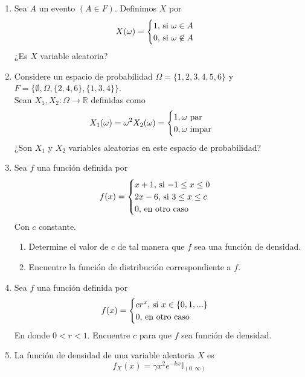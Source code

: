 \documentclass[12pt,a4paper]{report}
\begin{document}
	\begin{enumerate}
		\item {
			Sea $A$ un evento $(A \in F)$. Definimos $X$ por
			\[
				X(\omega) =
				\begin{cases}
					1, $ si $\omega \in A\\
					0, $ si $\omega \not\in A
				\end{cases}
			\]
			¿Es $X$ variable aleatoria?
		}
		\item {
			Considere un espacio de probabilidad $\Omega = \{1, 2, 3, 4, 5, 6\}$ y
			$F = \{\emptyset, \Omega, \{2, 4, 6\}, \{1, 3, 4\}\}$.\\
			Sean $X_1, X_2 : \Omega \rightarrow \mathbb{R}$ definidas como
			\begin{align*}
				X_1(\omega) = \omega^2 & X_2(\omega) = \begin{cases}
																								1, \omega $ par$\\
																								0, \omega $ impar$
																							\end{cases}
			\end{align*}
			¿Son $X_1$ y $X_2$ variables aleatorias en este espacio de probabilidad?
		}
		\item {
			Sea $f$ una función definida por
			\[
				f(x) = \begin{cases}
								x+1, $ si $ -1 \leq x \leq 0\\
								2x-6, $ si $ 3 \leq x \leq c\\
								0, $ en otro caso$
			\end{cases}
			\]
			Con $c$ constante.
			\begin{enumerate}
				\item {
					Determine el valor de $c$ de tal manera que $f$ sea una función de
					densidad.
				}
				\item {
					Encuentre la función de distribución correspondiente a $f$.
				}
			\end{enumerate}
		}
		\item {
			Sea $f$ una función definida por
			\[
				f(x) = \begin{cases}
								cr^x, $ si $ x \in \{0, 1, ...\}\\
								0, $ en otro caso$
							 \end{cases}
			\]
			En donde $0 < r < 1$. Encuentre $c$ para que $f$ sea función de densidad.
		}
		\item {
		La función de densidad de una variable aleatoria $X$ es
		\[f_X(x) = \gamma x^2 e^{-kx}\mathbb{I}_{(0, \infty)}\]
}
\end{enumerate}
\end{document}
